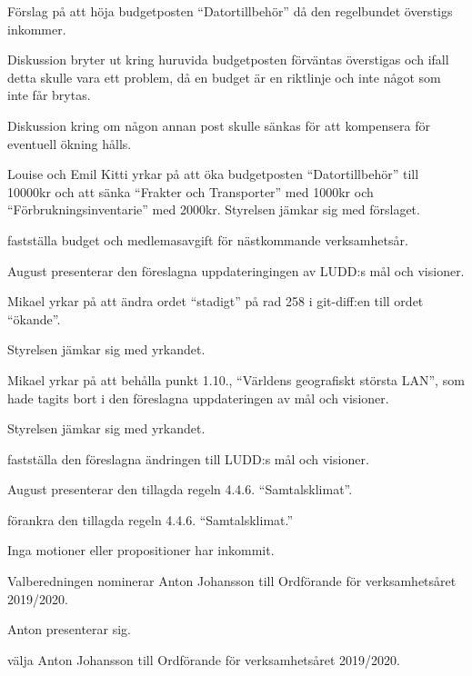 \documentclass{protokoll}
\begin{document}
Förslag på att höja budgetposten ``Datortillbehör'' då den regelbundet
överstigs inkommer.  


Diskussion bryter ut kring huruvida budgetposten förväntas överstigas och ifall
detta skulle vara ett problem, då en budget är en riktlinje och inte något som
inte får brytas.  


Diskussion kring om någon annan post skulle sänkas för att kompensera för
eventuell ökning hålls. 

Louise och Emil Kitti yrkar på att öka budgetposten ``Datortillbehör'' till 
10000kr och att sänka ``Frakter och Transporter'' med 1000kr och ``Förbrukningsinventarie'' med 2000kr. 
Styrelsen jämkar sig med förslaget. 
\begin{beslut}
  \att fastställa budget och medlemasavgift för nästkommande verksamhetsår. 
\end{beslut}

August presenterar den föreslagna uppdateringingen av LUDD:s mål och visioner. 

Mikael yrkar på att ändra ordet ``stadigt'' på rad 258 i git-diff:en till ordet
``ökande''. 

Styrelsen jämkar sig med yrkandet. 


Mikael yrkar på att behålla punkt 1.10., ``Världens geografiskt största LAN'',
som hade tagits bort i den föreslagna uppdateringen av mål och visioner. 

Styrelsen jämkar sig med yrkandet. 

\begin{beslut}
  \att fastställa den föreslagna ändringen till LUDD:s mål och visioner. 
\end{beslut}


August presenterar den tillagda regeln 4.4.6. ``Samtalsklimat''.

\begin{beslut}
  \att förankra den tillagda regeln 4.4.6. ``Samtalsklimat.''
\end{beslut}

Inga motioner eller propositioner har inkommit.

Valberedningen nominerar Anton Johansson till Ordförande för verksamhetsåret 2019/2020.

Anton presenterar sig.

\begin{beslut}
  \att välja Anton Johansson till Ordförande för verksamhetsåret 2019/2020.
\end{beslut}
\end{document}
